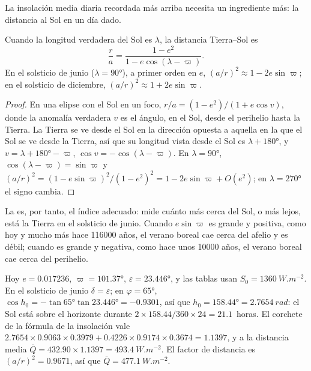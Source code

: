 La insolación media diaria recordada más arriba necesita un ingrediente más: la distancia al Sol en un
día dado.

\begin{proposition}\label{prop:b2:orbital-forcing:distance}
Cuando la longitud verdadera del Sol es $\lambda$, la distancia Tierra--Sol es
\[
  \frac{r}{a} = \frac{1 - e^2}{1 - e\cos(\lambda - \varpi)} .
\]
En el solsticio de junio ($\lambda = \ang{90}$), a primer orden en $e$,
$(a/r)^2 \approx 1 - 2e\sin\varpi$; en el solsticio de diciembre, $(a/r)^2 \approx 1 + 2e\sin\varpi$.
\end{proposition}

\begin{proof}
En una elipse con el Sol en un foco, $r/a = (1 - e^2)/(1 + e\cos v)$, donde la anomalía verdadera $v$
es el ángulo, en el Sol, desde el perihelio hasta la Tierra. La Tierra se ve desde el Sol en la
dirección opuesta a aquella en la que el Sol se ve desde la Tierra, así que su longitud vista desde el Sol es
$\lambda + \ang{180}$, y $v = \lambda + \ang{180} - \varpi$, $\cos v = -\cos(\lambda - \varpi)$.
En $\lambda = \ang{90}$, $\cos(\lambda - \varpi) = \sin\varpi$ y $(a/r)^2 = (1 -
e\sin\varpi)^2/(1 - e^2)^2 = 1 - 2e\sin\varpi + O(e^2)$; en $\lambda = \ang{270}$ el signo cambia.
\end{proof}

La  es, por tanto, el índice adecuado: mide cuánto más cerca del Sol, o más
lejos, está la Tierra en el solsticio de junio. Cuando $e\sin\varpi$ es grande y positiva, como hoy y
mucho más hace \num{116000} años, el verano boreal cae cerca del afelio y es débil; cuando es
grande y negativa, como hace unos \num{10000} años, el verano boreal cae cerca del perihelio.

\begin{example}\label{ex:b2:orbital-forcing:today}
Hoy $e = 0.017236$, $\varpi = \ang{101.37}$, $\varepsilon = \ang{23.446}$, y las tablas usan
$S_0 = \qty{1360}{W.m^{-2}}$. En el solsticio de junio $\delta = \varepsilon$; en $\varphi =
\ang{65}$, $\cos h_0 = -\tan\ang{65}\tan\ang{23.446} = -0.9301$, así que $h_0 = \ang{158.44} =
\qty{2.7654}{rad}$: el Sol está sobre el horizonte durante $2 \times 158.44/360 \times 24 = 21.1$~horas. El corchete de
la fórmula de la insolación vale $2.7654 \times 0.9063 \times 0.3979 + 0.4226 \times 0.9174 \times 0.3674 =
1.1397$, y a la distancia media $\bar Q = 432.90 \times 1.1397 = \qty{493.4}{W.m^{-2}}$. El
factor de distancia es $(a/r)^2 = 0.9671$, así que $\bar Q = \qty{477.1}{W.m^{-2}}$.
\end{example}

